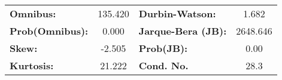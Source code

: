 \begin{center}
\begin{tabular}{lcccccc}
\bottomrule
\end{tabular}
\end{center}\begin{center}
\begin{tabular}{lclc}
\toprule
\textbf{Omnibus:}       & 135.420 & \textbf{  Durbin-Watson:     } &    1.682  \\
\textbf{Prob(Omnibus):} &   0.000 & \textbf{  Jarque-Bera (JB):  } & 2648.646  \\
\textbf{Skew:}          &  -2.505 & \textbf{  Prob(JB):          } &     0.00  \\
\textbf{Kurtosis:}      &  21.222 & \textbf{  Cond. No.          } &     28.3  \\
\bottomrule
\end{tabular}
\end{center}



